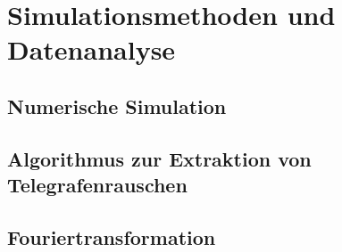 \documentclass[main.tex]{subfiles}
\begin{document}
\section{Simulationsmethoden und Datenanalyse}

\subsection{Numerische Simulation}

\subsection{Algorithmus zur Extraktion von Telegrafenrauschen}

\subsection{Fouriertransformation}
\end{document}

